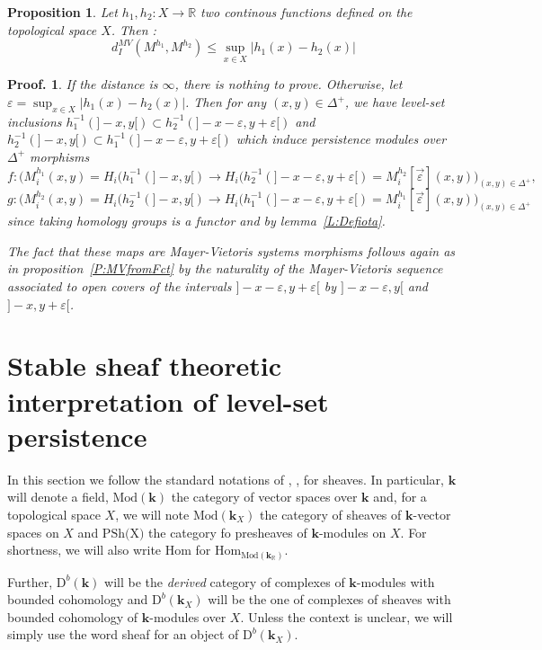 \documentclass[a4paper, english, 11pt]{article}
\newcommand{\kk}[0]{\textbf{k}}
\newcommand{\Mod}[0]{\text{Mod}}
\newcommand{\0}{\vec{0}}
\newcommand{\R}[0]{\mathbb{R}}
\newcommand{\D}[0]{\text{D}}
\newcommand{\Hom}[0]{\text{Hom}}
\newtheorem{prop}{Proposition}[section]
\newtheorem*{pf}{Proof.} }
\begin{document}
\begin{prop}\label{P:StabilityfordMV}
Let $h_1,h_2 : X \to \R$ two continous functions defined on the topological space $X$. Then : $$d_I^{MV}(M^{h_1},M^{h_2})\leq \sup_{x\in X} |h_1(x)-h_2(x)| $$

\end{prop}
\begin{pf} If the distance is $\infty$, there is nothing to prove. Otherwise, let $\varepsilon= \sup_{x\in X} |h_1(x)-h_2(x)|$. Then for any $(x,y)\in \Delta^{+}$, we have  level-set inclusions  $h^{-1}_1(]-x,y[) \subset h^{-1}_2(]-x-\varepsilon, y+\varepsilon[)$ and  $h^{-1}_2(]-x,y[) \subset h^{-1}_1(]-x-\varepsilon, y+\varepsilon[)$ which induce persistence modules over $\Delta^+$ morphisms 
$$f:\big(M_i^{h_1}(x,y)=H_i(h_1^{-1}(]-x,y[) \to H_i(h_2^{-1}(]-x-\varepsilon,y+\varepsilon[)= M_i^{h_2}[\vec{\varepsilon}](x,y)\big)_{(x,y)\in \Delta^+},  $$ 
$$g:\big(M_i^{h_2}(x,y)=H_i(h_2^{-1}(]-x,y[) \to H_i(h_1^{-1}(]-x-\varepsilon,y+\varepsilon[)= M_i^{h_1}[\vec{\varepsilon}](x,y)\big)_{(x,y)\in \Delta^+} $$ since 
taking homology groups is a functor and by lemma~\ref{L:Defiota}. 

The fact that these maps are Mayer-Vietoris systems morphisms follows again as in proposition~\ref{P:MVfromFct} by the naturality of the Mayer-Vietoris sequence associated to open covers of the intervals $]-x-\varepsilon, y+\varepsilon[$ by $]-x-\varepsilon, y[$ and $]-x, y+\varepsilon[$.
\end{pf}


\section{Stable sheaf theoretic interpretation of level-set persistence}
In this section we follow the standard notations of \cite{Kash90}, \cite{KS18}, \cite{Berk18} for sheaves. 
In particular,  $\kk$ will denote a field, $\Mod(\kk)$ the category of vector spaces over $\kk$ and, for   a topological space $X$,  we will note $\Mod(\kk_X)$ the category of sheaves of $\kk$-vector spaces on $X$ and $\text{PSh(X)}$ the category fo presheaves of $\kk$-modules on $X$. For shortness, we will also write $\Hom$ for $\Hom_{\Mod(\kk_\R)}$.

Further, $\D^b(\kk)$ will be the \emph{derived} category of complexes of $\kk$-modules with bounded cohomology and $\D^b(\kk_X)$ will be the one of complexes of sheaves with bounded cohomology of $\kk$-modules over $X$. 
 Unless the context is unclear, we will simply use the word  sheaf for an object of $\D^b(\kk_X)$. 
 
\end{document}
